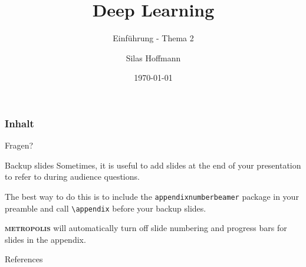 \documentclass[10pt, handout]{beamer} %
\title{Deep Learning}
\subtitle{Einführung - Thema 2}
\date{\today}
\author{Silas Hoffmann}
\institute{Fachhochschule Wedel}
\newcommand{\themename}{\textbf{\textsc{metropolis}}\xspace}
\begin{document}
\maketitle

\begin{frame}
\frametitle{Inhalt}
\tableofcontents
\end{frame}




\maketitle

\begin{frame}[standout]
Fragen?
\end{frame}


\appendix

\begin{frame}[fragile]{Backup slides}
  Sometimes, it is useful to add slides at the end of your presentation to
  refer to during audience questions.

  The best way to do this is to include the \verb|appendixnumberbeamer|
  package in your preamble and call \verb|\appendix| before your backup slides.

  \themename will automatically turn off slide numbering and progress bars for
  slides in the appendix.
\end{frame}

\begin{frame}[allowframebreaks]{References}
  \nocite{*} 
  
  
\end{frame}
\end{document}
